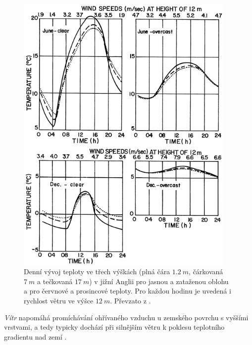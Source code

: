 \begin{figure}
	\centering
	\includegraphics[width=0.95\textwidth]{img/ch1/diurnaltemp.png}
	\caption{Denní vývoj teploty ve třech výškách (plná čára $\SI{1.2}{m}$, čárkovaná $\SI{7}{m}$ a tečkovaná $\SI{17}{m}$) v jižní Anglii pro jasnou a zataženou oblohu a pro červnové a prosincové teploty. Pro každou hodinu je uvedená i rychlost větru ve výšce $\SI{12}{m}$. Převzato z \cite{arya2001}.}
	\label{fig:diurnaltemp}
\end{figure}

\textit{Vítr} napomáhá promíchávání ohřívaného vzduchu u zemského povrchu s vyššími vrstvami, a tedy typicky dochází při silnějším větru k poklesu teplotního gradientu nad zemí \parencite{arya2001}.

